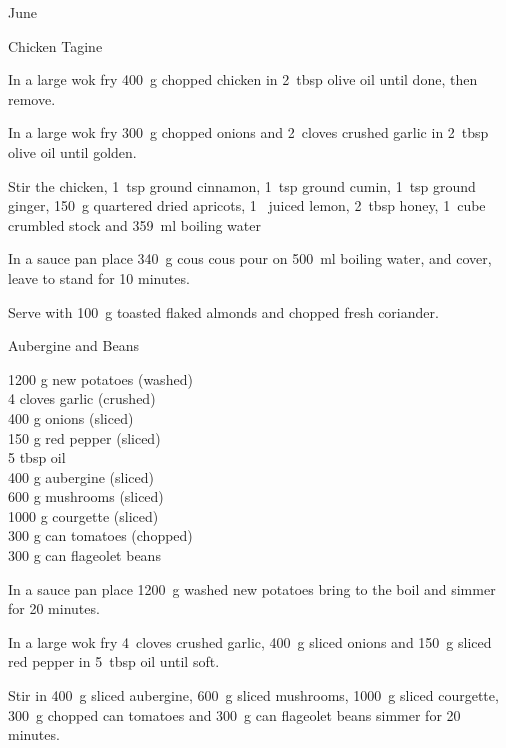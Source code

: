 \begin{menu}{June}
\begin{recipe}{2}{Chicken Tagine}
	
    \begin{instructions}
    \item 
        In a large wok fry
        400~g chopped chicken
        in
        2~tbsp  olive oil
        until done, then remove.
      \item 
        In a large wok fry
        300~g chopped onions
        and
        2~cloves crushed garlic
        in
        2~tbsp  olive oil
        until golden.
      \item 
        Stir the chicken,
        1~tsp  ground cinnamon,
        1~tsp  ground cumin,
        1~tsp  ground ginger,
        150~g quartered dried apricots,
        1~ juiced lemon,
        2~tbsp  honey,
        1~cube crumbled stock
        and
        359~ml  boiling water\item 
    In a
    sauce pan 
    place
    340~g  cous cous
    pour on
    500~ml  boiling water,
    and cover, leave to stand for 10 minutes.
  \item 
        Serve with
        100~g toasted flaked almonds
        and
         chopped fresh coriander.
      
    \end{instructions}
    \end{recipe}%
  
    \begin{recipe}{2}{Aubergine and Beans}%
		\begin{ingredients}
		1200 g new potatoes (washed) \\
	4 cloves garlic (crushed) \\
	400 g onions (sliced) \\
	150 g red pepper (sliced) \\
	5 tbsp oil  \\
	400 g aubergine (sliced) \\
	600 g mushrooms (sliced) \\
	1000 g courgette (sliced) \\
	300 g can tomatoes (chopped) \\
	300 g can flageolet beans  \\
	
		\end{ingredients}
	
	
    \begin{instructions}
    \item 
    In a sauce pan place
    1200~g washed new potatoes
    bring to the boil and simmer for 20 minutes.
  \item 
        In a large wok fry
        4~cloves crushed garlic,
        400~g sliced onions
        and
        150~g sliced red pepper
        in
        5~tbsp  oil
        until soft.
      \item 
        Stir in
        400~g sliced aubergine,
        600~g sliced mushrooms,
        1000~g sliced courgette,
        300~g chopped can tomatoes
        and
        300~g  can flageolet beans
        simmer for 20 minutes.
      

\end{instructions}
\end{recipe}
\end{menu}
